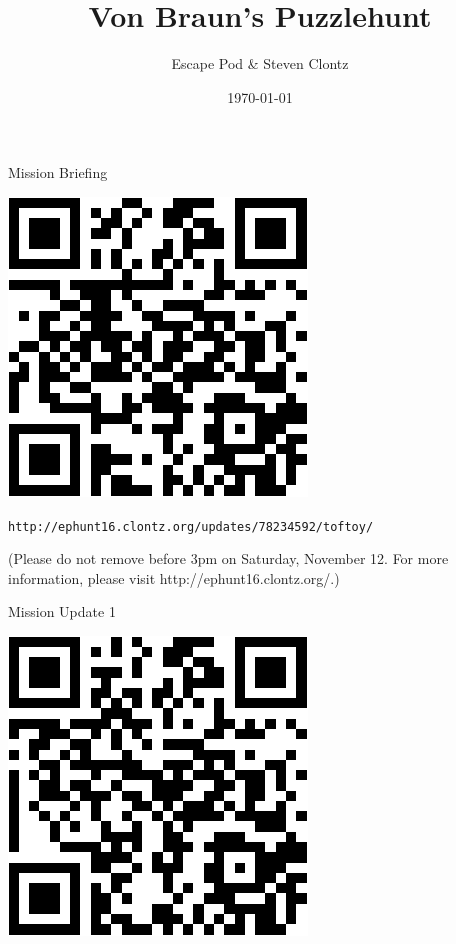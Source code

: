\documentclass{puzzlehunt}
\title{Von Braun's Puzzlehunt}
\author{Escape Pod \& Steven Clontz}
\date{\today}
\begin{document}
%
%
%


\Large




Mission Briefing

\begin{center}
  \includegraphics[width=0.7\linewidth]{qr/toftoy.png}
\end{center}

\verb|http://ephunt16.clontz.org/updates/78234592/toftoy/|

\vfill

{\footnotesize (Please do not remove before 3pm on Saturday, November 12.
For more information, please visit http://ephunt16.clontz.org/.)}



Mission Update 1

\begin{center}
  \includegraphics[width=0.7\linewidth]{qr/vbc.png}
\end{center}
\end{document}
